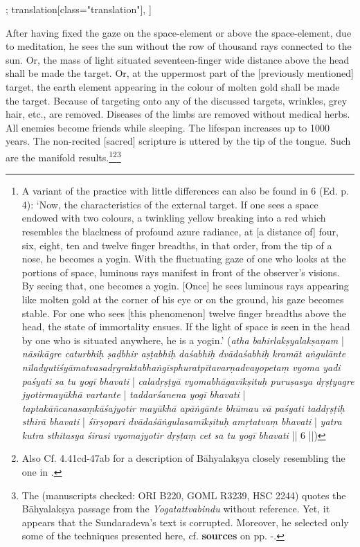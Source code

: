 \begin{alignment}[
  texts=edition[class="edition"];
  translation[class="translation"],
  ]
\begin{translation}
\begin{tlate}[p23_02]
After having fixed the gaze on the space-element or above the space-element, due to meditation, he sees the sun without the row of thousand rays connected to the sun. Or, the mass of light situated seventeen-finger wide distance above the head shall be made the target. Or, at the uppermost part of the [previously mentioned] target, the earth element appearing in the colour of molten gold shall be made the target. Because of targeting onto any of the discussed targets, wrinkles, grey hair, etc., are removed. Diseases of the limbs are removed without medical herbs. All enemies become friends while sleeping. The lifespan increases up to 1000 years. The non-recited [sacred] scripture is uttered by the tip of the tongue. Such are the manifold results.\footnote{A variant of the practice with little differences can also be found in  6 (Ed. p. 4): `Now, the characteristics of the external target. If one sees a space endowed with two colours, a twinkling yellow breaking into a red which resembles the blackness of profound azure radiance, at [a distance of] four, six, eight, ten and twelve finger breadths, in that order, from the tip of a nose, he becomes a yogin. With the fluctuating gaze of one who looks at the portions of space, luminous rays manifest in front of the observer's visions. By seeing that, one becomes a yogin. [Once] he sees luminous rays appearing like molten gold at the corner of his eye or on the ground, his gaze becomes stable. For one who sees [this phenomenon] twelve finger breadths above the head, the state of immortality ensues. If the light of space is seen in the head by one who is situated anywhere, he is a yogin.' (\textit{atha bahirlakṣyalakṣaṇam} | \textit{nāsikāgre caturbhiḥ ṣaḍbhir aṣṭabhiḥ daśabhiḥ dvādaśabhiḥ kramāt aṅgulānte nīladyutiśyāmatvasadṛgraktabhaṅgīsphuratpītavarṇadvayopetaṃ vyoma yadi paśyati sa tu yogī bhavati} | \textit{caladṛṣṭyā vyomabhāgavīkṣituḥ puruṣasya dṛṣṭyagre jyotirmayūkhā vartante} | \textit{taddarśanena yogī bhavati} | \textit{taptakāñcanasaṃkāśajyotir mayūkhā apāṅgānte bhūmau vā paśyati taddṛṣṭiḥ sthirā bhavati} | \textit{śīrṣopari dvādaśāṅgulasamīkṣituḥ amṛtatvaṃ bhavati} | \textit{yatra kutra sthitasya śirasi vyomajyotir dṛṣṭaṃ cet sa tu yogī bhavati} || 6 ||)}\footnote{Also Cf.  4.41cd-47ab for a description of Bāhyalakṣya closely resembling the one in .}\footnote{The  (manuscripts checked: ORI B220, GOML R3239, HSC 2244) quotes the Bāhyalakṣya passage from the \textit{Yogatattvabindu} without reference. Yet, it appears that the Sundaradeva's text is corrupted. Moreover, he selected only some of the techniques presented here, cf. \textbf{sources} on pp. \pageref{bahya}-\pageref{continuebahya}.}
\flushpage
\end{tlate}
  \end{translation}
\end{alignment}
